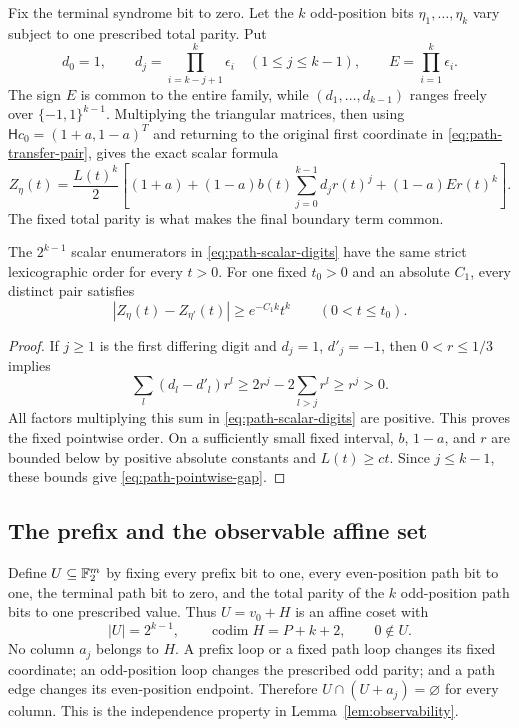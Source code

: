 Fix the terminal syndrome bit to zero. Let the $k$ odd-position bits
$\eta_1,\ldots,\eta_k$ vary subject to one prescribed total parity.
Put
\[
 d_0=1,\qquad
 d_j=\prod_{i=k-j+1}^k\epsilon_i\quad(1\le j\le k-1),\qquad
 E=\prod_{i=1}^k\epsilon_i.
\]
The sign $E$ is common to the entire family, while
$(d_1,\ldots,d_{k-1})$ ranges freely over $\{-1,1\}^{k-1}$.
Multiplying the triangular matrices, then using
$\mathsf Hc_0=(1+a,1-a)^T$ and returning to the original first
coordinate in \eqref{eq:path-transfer-pair}, gives the exact scalar
formula
\begin{equation}\label{eq:path-scalar-digits}
 Z_\eta(t)=\frac{L(t)^k}{2}
 \left[(1+a)+(1-a)b(t)\sum_{j=0}^{k-1}d_jr(t)^j
                     +(1-a)E r(t)^k\right].
\end{equation}
The fixed total parity is what makes the final boundary term common.

\begin{lemma}
\label{lem:path-pointwise-order}
The $2^{k-1}$ scalar enumerators in
\eqref{eq:path-scalar-digits} have the same strict lexicographic order
for every $t>0$. For one fixed $t_0>0$ and an absolute $C_1$, every
distinct pair satisfies
\begin{equation}\label{eq:path-pointwise-gap}
 |Z_\eta(t)-Z_{\eta'}(t)|\ge e^{-C_1k}t^k
 \qquad(0<t\le t_0).
\end{equation}
\end{lemma}
\begin{proof}
If $j\ge1$ is the first differing digit and $d_j=1$, $d'_j=-1$,
then $0<r\le1/3$ implies
\[
 \sum_l(d_l-d'_l)r^l
 \ge2r^j-2\sum_{l>j}r^l\ge r^j>0.
\]
All factors multiplying this sum in \eqref{eq:path-scalar-digits}
are positive. This proves the fixed pointwise order. On a sufficiently
small fixed interval, $b$, $1-a$, and $r$ are bounded below by positive
absolute constants and $L(t)\ge ct$. Since $j\le k-1$, these bounds
give \eqref{eq:path-pointwise-gap}.
\end{proof}

\subsection{The prefix and the observable affine set}

Define $U\subseteq\mathbb F_2^m$ by fixing every prefix bit to one, every
even-position path bit to one, the terminal path bit to zero, and the
total parity of the $k$ odd-position path bits to one prescribed value.
Thus $U=v_0+H$ is an affine coset with
\[
 |U|=2^{k-1},\qquad \operatorname{codim}H=P+k+2,\qquad 0\notin U.
\]
No column $a_j$ belongs to $H$. A prefix loop or a fixed path loop
changes its fixed coordinate; an odd-position loop changes the
prescribed odd parity; and a path edge changes its even-position
endpoint. Therefore $U\cap(U+a_j)=\varnothing$ for every column.
This is the independence property in Lemma~\ref{lem:observability}.

